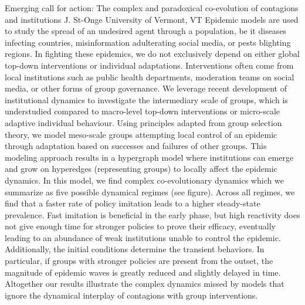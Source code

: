 
    \begin{abstract_online}{Emerging call for action: The complex and paradoxical co-evolution of contagions and institutions}{%
        J. St-Onge}{%
        }{%
        University of Vermont, VT}
    Epidemic models are used to study the spread of an undesired agent through a population, be it diseases infecting countries, misinformation adulterating social media, or pests blighting regions. In fighting these epidemics, we do not exclusively depend on either global top-down interventions or individual adaptations. Interventions often come from local institutions such as public health departments, moderation teams on social media, or other forms of group governance. We leverage recent development of institutional dynamics to investigate the intermediary scale of groups, which is understudied compared to macro-level top-down interventions or micro-scale adaptive individual behaviour. Using principles adapted from group selection theory, we model meso-scale groups attempting local control of an epidemic through adaptation based on successes and failures of other groups. This modeling approach results in a hypergraph model where institutions can emerge and grow on hyperedges (representing groups) to locally affect the epidemic dynamics. In this model, we find complex co-evolutionary dynamics which we summarize as five possible dynamical regimes (see figure). Across all regimes, we find that a faster rate of policy imitation leads to a higher steady-state prevalence. Fast imitation is beneficial in the early phase, but high reactivity does not give enough time for stronger policies to prove their efficacy, eventually leading to an abundance of weak institutions unable to control the epidemic. Additionally, the initial conditions determine the transient behaviors. In particular, if groups with stronger policies are present from the outset, the magnitude of epidemic waves is greatly reduced and slightly delayed in time. Altogether our results illustrate the complex dynamics missed by models that ignore the dynamical interplay of contagions with group interventions. 
    
    \end{abstract_online}
    